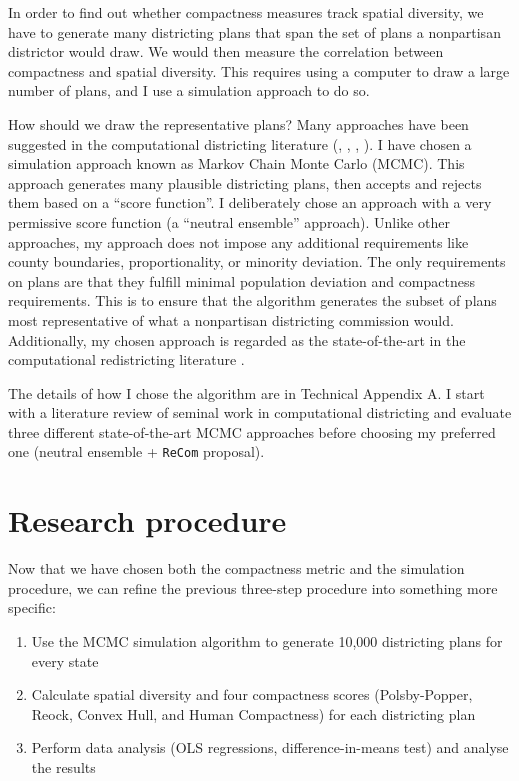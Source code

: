 \documentclass[]{article}
\providecommand{\tightlist}{%
  \setlength{\itemsep}{0pt}\setlength{\parskip}{0pt}}
\begin{document}
In order to find out whether compactness measures track spatial
diversity, we have to generate many districting plans that span the set
of plans a nonpartisan districtor would draw. We would then measure the
correlation between compactness and spatial diversity. This requires
using a computer to draw a large number of plans, and I use a simulation
approach to do so.

How should we draw the representative plans? Many approaches have been
suggested in the computational districting literature (\cite{ccd2000},
\cite{cr2013}, \cite{fifieldwp}, \cite{ddj2019recom}). I have chosen a
simulation approach known as Markov Chain Monte Carlo (MCMC). This
approach generates many plausible districting plans, then accepts and
rejects them based on a ``score function''. I deliberately chose an
approach with a very permissive score function (a ``neutral ensemble''
approach). Unlike other approaches, my approach does not impose any
additional requirements like county boundaries, proportionality, or
minority deviation. The only requirements on plans are that they fulfill
minimal population deviation and compactness requirements. This is to
ensure that the algorithm generates the subset of plans most
representative of what a nonpartisan districting commission would.
Additionally, my chosen approach is regarded as the state-of-the-art in
the computational redistricting literature \citep{ddj2019recom}.

The details of how I chose the algorithm are in Technical Appendix A. I
start with a literature review of seminal work in computational
districting and evaluate three different state-of-the-art MCMC
approaches before choosing my preferred one (neutral ensemble +
\texttt{ReCom} proposal).

\hypertarget{research-procedure}{%
\section{Research procedure}\label{research-procedure}}

Now that we have chosen both the compactness metric and the simulation
procedure, we can refine the previous three-step procedure into
something more specific:

\begin{enumerate}
\def\labelenumi{\arabic{enumi}.}
\tightlist
\item
  Use the MCMC simulation algorithm to generate 10,000 districting plans
  for every state
\item
  Calculate spatial diversity and four compactness scores
  (Polsby-Popper, Reock, Convex Hull, and Human Compactness) for each
  districting plan
\item
  Perform data analysis (OLS regressions, difference-in-means test) and
  analyse the results
\end{enumerate}
\end{document}
